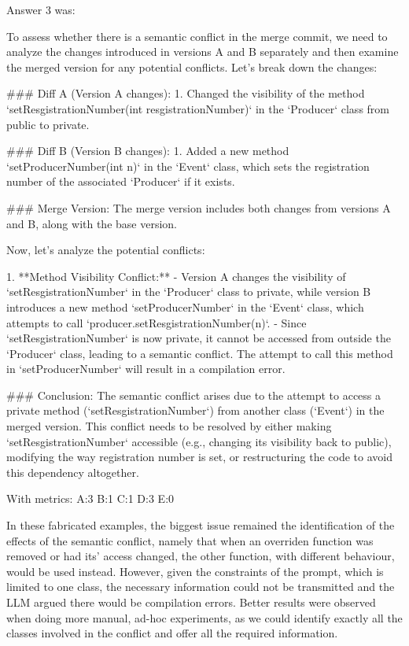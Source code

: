 Answer 3 was:
\begin{spverbatim}
To assess whether there is a semantic conflict in the merge commit, we need to analyze the changes introduced in versions A and B separately and then examine the merged version for any potential conflicts. Let's break down the changes:

### Diff A (Version A changes):
1. Changed the visibility of the method `setResgistrationNumber(int resgistrationNumber)` in the `Producer` class from public to private.

### Diff B (Version B changes):
1. Added a new method `setProducerNumber(int n)` in the `Event` class, which sets the registration number of the associated `Producer` if it exists.

### Merge Version:
The merge version includes both changes from versions A and B, along with the base version.

Now, let's analyze the potential conflicts:

1. **Method Visibility Conflict:**
   - Version A changes the visibility of `setResgistrationNumber` in the `Producer` class to private, while version B introduces a new method `setProducerNumber` in the `Event` class, which attempts to call `producer.setResgistrationNumber(n)`.
   - Since `setResgistrationNumber` is now private, it cannot be accessed from outside the `Producer` class, leading to a semantic conflict. The attempt to call this method in `setProducerNumber` will result in a compilation error.

### Conclusion:
The semantic conflict arises due to the attempt to access a private method (`setResgistrationNumber`) from another class (`Event`) in the merged version. This conflict needs to be resolved by either making `setResgistrationNumber` accessible (e.g., changing its visibility back to public), modifying the way registration number is set, or restructuring the code to avoid this dependency altogether.
\end{spverbatim}

With metrics:
A:3
B:1
C:1
D:3
E:0

In these fabricated examples, the biggest issue remained the identification of the effects of the semantic conflict, namely that when an overriden function was removed or had its' access changed, the other function, with different behaviour, would be used instead. However, given the constraints of the prompt, which is limited to one class, the necessary information could not be transmitted and the LLM argued there would be compilation errors. Better results were observed when doing more manual, ad-hoc experiments, as we could identify exactly all the classes involved in the conflict and offer all the required information.

